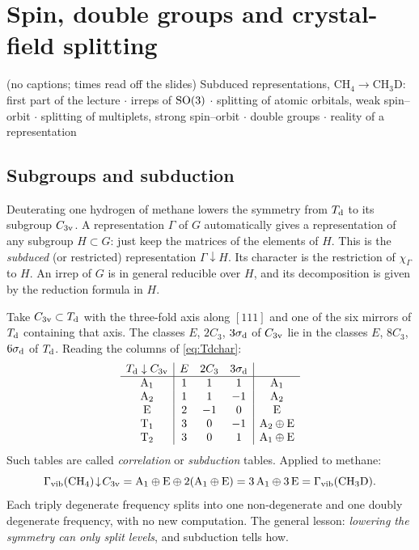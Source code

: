 \chapter{Spin, double groups and crystal-field splitting}\label{ch:spin}

\begin{watch}{ (no captions; times read off the slides)}
Subduced representations, $\mathrm{CH_4}\to\mathrm{CH_3D}$: first part of the lecture $\cdot$
irreps of $\mathrm{SO}(3)$  $\cdot$
splitting of atomic orbitals, weak spin--orbit  $\cdot$
splitting of multiplets, strong spin--orbit  $\cdot$
double groups  $\cdot$
reality of a representation 
\end{watch}

\section{Subgroups and subduction}\label{sec:subduction}

Deuterating one hydrogen of methane lowers the symmetry from $T_{\mathrm{d}}$ to its subgroup
$C_{3\mathrm{v}}$. A representation $\Gamma$ of $G$ automatically gives a representation of
any subgroup $H\subset G$: just keep the matrices of the elements of $H$. This is the
\emph{subduced} (or restricted) representation $\Gamma\!\downarrow\!H$. Its character is
the restriction of $\chi_\Gamma$ to $H$. An irrep of $G$ is in general reducible
over $H$, and its decomposition is given by the reduction formula in $H$.

Take $C_{3\mathrm{v}}\subset T_{\mathrm{d}}$ with the three-fold axis along $[111]$ and one of the six
mirrors of $T_{\mathrm{d}}$ containing that axis. The classes $E$, $2C_3$, $3\sigma_{\mathrm{d}}$ of $C_{3\mathrm{v}}$ lie
in the classes $E$, $8C_3$, $6\sigma_{\mathrm{d}}$ of $T_{\mathrm{d}}$. Reading the columns of \eqref{eq:Tdchar}:
\begin{equation}\label{eq:TdC3v}
\begin{array}{c|ccc|c}
T_{\mathrm{d}}\downarrow C_{3\mathrm{v}} & E & 2C_3 & 3\sigma_{\mathrm{d}} & \\\hline
\mathrm{A}_1 & 1 & 1 & 1 & \mathrm{A}_1\\
\mathrm{A}_2 & 1 & 1 & -1 & \mathrm{A}_2\\
\mathrm{E} & 2 & -1 & 0 & \mathrm{E}\\
\mathrm{T}_1 & 3 & 0 & -1 & \mathrm{A}_2\oplus\mathrm{E}\\
\mathrm{T}_2 & 3 & 0 & 1 & \mathrm{A}_1\oplus\mathrm{E}
\end{array}
\end{equation}
Such tables are called \emph{correlation} or \emph{subduction} tables. Applied to methane:
\[
\Gamma_{\mathrm{vib}}(\mathrm{CH_4})\!\downarrow\!C_{3\mathrm{v}}=\mathrm{A}_1\oplus\mathrm{E}\oplus2(\mathrm{A}_1\oplus\mathrm{E})
=3\,\mathrm{A}_1\oplus3\,\mathrm{E}=\Gamma_{\mathrm{vib}}(\mathrm{CH_3D}).
\]
Each triply degenerate frequency splits into one non-degenerate and one doubly
degenerate frequency, with no new computation. The general lesson: \emph{lowering the
symmetry can only split levels}, and subduction tells how.

